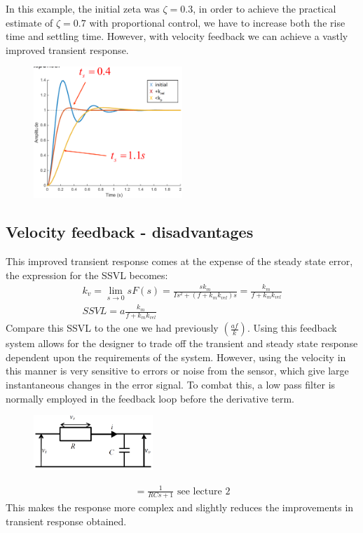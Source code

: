 \documentclass[class=report, crop=false, 12pt,a4paper]{standalone}
\begin{document}
In this example, the initial zeta was $\zeta = 0.3$, in order to achieve the practical estimate of $\zeta = 0.7$ with proportional control, we have to increase both the rise time and settling time. However, with velocity feedback we can achieve a vastly improved transient response.
\begin{figure}[H]
  \centerline{\includegraphics[width = 0.5\textwidth]{../img/diagram114.png}}
  \caption{}
\end{figure}
\subsection{Velocity feedback - disadvantages}
This improved transient response comes at the expense of the steady state error, the expression for the SSVL becomes:
\begin{gather}
  k_v = \lim_{s\rightarrow 0} s F(s) = \frac{sk_m}{Is^2 + \left( f + k_m k_{vel}\right)s} = \frac{k_m}{f + k_m k_{vel}}\\
  SSVL = a \frac{k_m}{f + k_m k_{vel}}
\end{gather}
Compare this SSVL to the one we had previously $\left( \frac{af}{k}\right)$. Using this feedback system allows for the designer to trade off the transient and steady state response dependent upon the requirements of the system. However, using the velocity in this manner is very sensitive to errors or noise from the sensor, which give large instantaneous changes in the error signal. To combat this, a low pass filter is normally employed in the feedback loop before the derivative term. 
\begin{figure}[H]
  \centerline{\includegraphics[width = 0.4\textwidth]{../img/diagram115.png}}
  \caption{}
\end{figure}
\begin{gather}
  = \frac{1}{RCs + 1} \textrm{ see lecture 2}
\end{gather}
This makes the response more complex and slightly reduces the improvements in transient response obtained.
\end{document}
